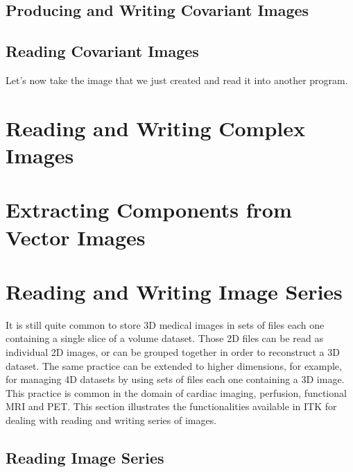 \subsection{Producing and Writing Covariant Images}
\label{CovariantVectorImageWrite}


\subsection{Reading Covariant Images}
\label{CovariantVectorImageRead}
Let's now take the image that we just created and read it into another program.



\section{Reading and Writing Complex Images}
\label{sec:ComplexImagReadWrite}



\section{Extracting Components from Vector Images}
\label{sec:VectorImageExtractComponent}



\section{Reading and Writing Image Series}

It is still quite common to store 3D medical images in sets of files each one
containing a single slice of a volume dataset. Those 2D files can be read as
individual 2D images, or can be grouped together in order to reconstruct a 3D
dataset. The same practice can be extended to higher dimensions, for example,
for managing 4D datasets by using sets of files each one containing a 3D image.
This practice is common in the domain of cardiac imaging, perfusion, functional
MRI and PET. This section illustrates the functionalities available in ITK for
dealing with reading and writing series of images.


\subsection{Reading Image Series}
\label{sec:ReadingImageSeries}


